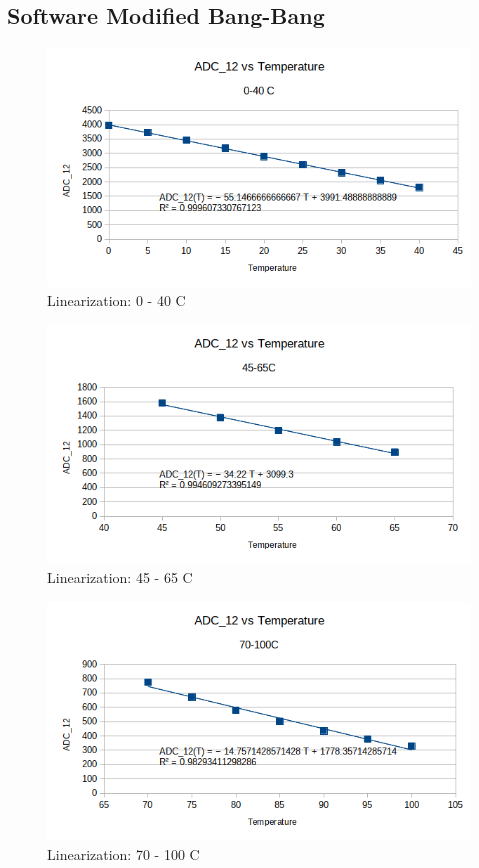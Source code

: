 \documentclass{hitec}
\begin{document}
\subsection{Software Modified Bang-Bang}

\begin{figure}[H]
    \centering
    \includegraphics[scale=0.7]{adc12_vs_temperature_0_40.png}
    \caption{Linearization: 0 - 40 \degree C}
    \label{fig:adc12_vs_temperature_0_40}
\end{figure}

\begin{figure}[H]
    \centering
    \includegraphics[scale=0.7]{adc12_vs_temperature_0_45_65.png}
    \caption{Linearization: 45 - 65 \degree C}\label{fig:adc12_vs_temperature_0_45_65}
\end{figure}

\begin{figure}[H]
    \centering
    \includegraphics[scale=0.7]{adc12_vs_temperature_70_100.png}
\caption{Linearization: 70 - 100 \degree C}\label{fig:adc12_vs_temperature_70_100}
\end{figure}
\end{document}
